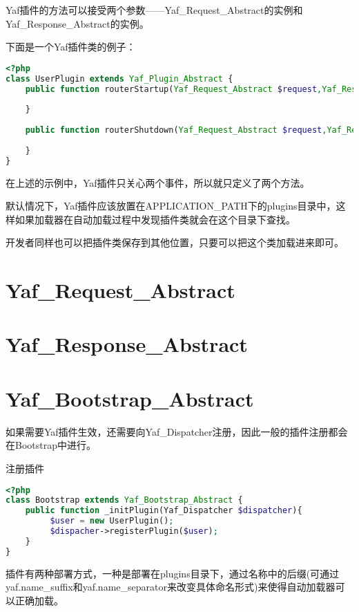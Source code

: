 Yaf插件的方法可以接受两个参数——Yaf\_Request\_Abstract的实例和Yaf\_Response\_Abstract的实例。

下面是一个Yaf插件类的例子：

\begin{lstlisting}[language=PHP]
<?php
class UserPlugin extends Yaf_Plugin_Abstract {
    public function routerStartup(Yaf_Request_Abstract $request,Yaf_Response_Abstract $response) {
    
    }
    
    public function routerShutdown(Yaf_Request_Abstract $request,Yaf_Response_Abstract $response){
    
    }
}
\end{lstlisting}

在上述的示例中，Yaf插件只关心两个事件，所以就只定义了两个方法。

默认情况下，Yaf插件应该放置在APPLICATION\_PATH下的plugins目录中，这样如果加载器在自动加载过程中发现插件类就会在这个目录下查找。

开发者同样也可以把插件类保存到其他位置，只要可以把这个类加载进来即可。


\section{Yaf\_Request\_Abstract}



\section{Yaf\_Response\_Abstract}



\section{Yaf\_Bootstrap\_Abstract}

如果需要Yaf插件生效，还需要向Yaf\_Dispatcher注册，因此一般的插件注册都会在Bootstrap中进行。

\begin{example}
注册插件
\begin{lstlisting}[language=PHP]
<?php
class Bootstrap extends Yaf_Bootstrap_Abstract {
    public function _initPlugin(Yaf_Dispatcher $dispatcher){
         $user = new UserPlugin();
         $dispacher->registerPlugin($user);
    }
}
\end{lstlisting}
\end{example}

插件有两种部署方式，一种是部署在plugins目录下，通过名称中的后缀(可通过yaf.name\_suffix和yaf.name\_separator来改变具体命名形式)来使得自动加载器可以正确加载。

